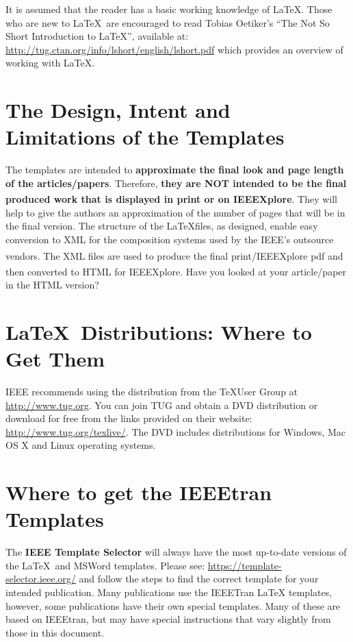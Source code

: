 \documentclass[lettersize,journal]{IEEEtran}
\begin{document}
It is assumed that the reader has a basic working knowledge of \LaTeX. Those who are new to \LaTeX \ are encouraged to read Tobias Oetiker's ``The Not So Short Introduction to \LaTeX '', available at: \url{http://tug.ctan.org/info/lshort/english/lshort.pdf} which provides an overview of working with \LaTeX.

\section{The Design, Intent and \\ Limitations of the Templates}
\noindent The templates are intended to {\bf{approximate the final look and page length of the articles/papers}}. Therefore, {\bf{they are NOT intended to be the final produced work that is displayed in print or on IEEEXplore\textsuperscript{\textregistered}}}. They will help to give the authors an approximation of the number of pages that will be in the final version. The structure of the \LaTeX files, as designed, enable easy conversion to XML for the composition systems used by the IEEE's outsource vendors. The XML files are used to produce the final print/IEEEXplore\textsuperscript{\textregistered} pdf and then converted to HTML for IEEEXplore\textsuperscript{\textregistered}. Have you looked at your article/paper in the HTML version?

\section{\LaTeX \ Distributions: Where to Get Them}
\noindent IEEE recommends using the distribution from the \TeX User Group at \url{http://www.tug.org}. You can join TUG and obtain a DVD distribution or download for free  from the links provided on their website: \url{http://www.tug.org/texlive/}. The DVD includes distributions for Windows, Mac OS X and Linux operating systems.

\section{Where to get the IEEEtran Templates}
\noindent The {\bf{IEEE Template Selector}} will always have the most up-to-date versions of the \LaTeX\ and MSWord templates. Please see: \url{https://template-selector.ieee.org/} and follow the steps to find the correct template for your intended publication. Many publications use the IEEETran LaTeX templates, however, some publications have their own special templates. Many of these are  based on IEEEtran, but may have special instructions that vary slightly from those in this document.
\end{document}
